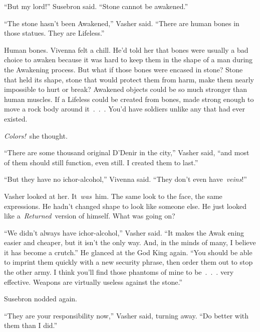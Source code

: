“But my lord!” Susebron said. “Stone cannot be awakened.”

“The stone hasn’t been Awakened,” Vasher said. “There are human bones in those statues. They are Lifeless.”

Human bones. Vivenna felt a chill. He’d told her that bones were usually a bad choice to awaken because it was hard to keep them in the shape of a man during the Awakening process. But what if those bones were encased in stone? Stone that held its shape, stone that would protect them from harm, make them nearly impossible to hurt or break? Awakened objects could be so much stronger than human muscles. If a Lifeless could be created from bones, made strong enough to move a rock body around it~.~.~. You’d have soldiers unlike any that had ever existed.

\textit{Colors!}~she thought.

“There are some thousand original D’Denir in the city,” Vasher said, “and most of them should still function, even still. I created them to last.”

“But they have no ichor-alcohol,” Vivenna said. “They don’t even have~\textit{veins}!”

Vasher looked at her. It~\textit{was}~him. The same look to the face, the same expressions. He hadn’t changed shape to look like someone else. He just looked like a~\textit{Returned}~version of himself. What was going on?

“We didn’t always have ichor-alcohol,” Vasher said. “It makes the Awak ening easier and cheaper, but it isn’t the only way. And, in the minds of many, I believe it has become a crutch.” He glanced at the God King again. “You should be able to imprint them quickly with a new security phrase, then order them out to stop the other army. I think you’ll find those phantoms of mine to be~.~.~. very effective. Weapons are virtually useless against the stone.”

Susebron nodded again.

“They are your responsibility now,” Vasher said, turning away. “Do better with them than I did.”

